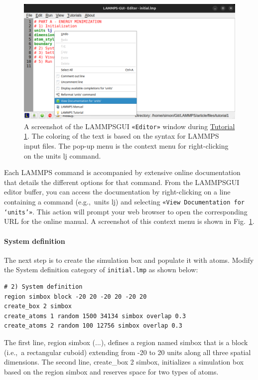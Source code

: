\documentclass[9pt,tutorial]{livecoms}
\newcommand{\lmpcmd}[1]{\hspace{0pt}\colorbox{listing}{\textcolor{command}{\small{#1}}}\hspace{0pt}} %
\newcommand{\flecmd}[1]{\textcolor{command}{\texttt{#1}}} %
\newcommand{\guicmd}[1]{\textcolor{command}{\texttt{«#1»}}} %
\newcommand{\lammpsgui}{\textsf{LAMMPS\textendash GUI}}
\begin{document}
\begin{figure}
\centering
\includegraphics[width=\linewidth]{GUI-1.png}
\caption{A screenshot of the \lammpsgui{} \guicmd{Editor} window during
  \hyperref[lennard-jones-label]{Tutorial 1}.  The coloring of the text
  is based on the syntax for LAMMPS input files.  The pop-up menu is the
  context menu for right-clicking on the \lmpcmd{units lj} command.}
\label{fig:GUI-1}
\end{figure}

Each LAMMPS command is accompanied by extensive online documentation
that details the different options for that command.  From the \lammpsgui{}
editor buffer, you can access the documentation by
right-clicking on a line containing a command (e.g.,~\lmpcmd{units lj}) and
selecting \guicmd{View Documentation for `units'}.  This action will
prompt your web browser to open the corresponding URL for the online manual.
A screenshot of this context menu is shown in Fig.~\ref{fig:GUI-1}.

\paragraph{System definition}

The next step is to create the simulation box and populate it with atoms.
Modify the \lmpcmd{System definition} category of \flecmd{initial.lmp} as shown below:
\begin{lstlisting}
# 2) System definition
region simbox block -20 20 -20 20 -20 20
create_box 2 simbox
create_atoms 1 random 1500 34134 simbox overlap 0.3
create_atoms 2 random 100 12756 simbox overlap 0.3
\end{lstlisting}
The first line, \lmpcmd{region simbox (...)}, defines a region
named \lmpcmd{simbox} that is a block (i.e.,~a rectangular
cuboid) extending from -20 to 20 units along all three spatial dimensions.
The second line, \lmpcmd{create\_box 2 simbox}, initializes a simulation box
based on the region \lmpcmd{simbox} and reserves space for two types of atoms.
\end{document}
